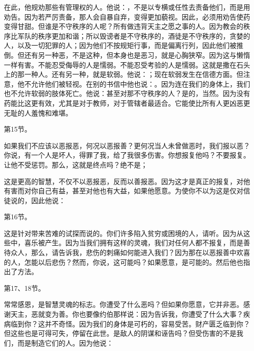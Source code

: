 在此，他规劝那些有管理权的人。他说：，不是以专横或任性去责备他们，而是用劝告。因为若严厉责备，那人会自暴自弃，变得更加藐视。因此，必须用劝告使药变得甘甜。但谁是不守秩序的人呢？所有做违背天主之愿之事的人。因为教会的秩序比军队的秩序更加和谐；所以毁谤者是不守秩序的，酒徒是不守秩序的，贪婪的人，以及一切犯罪的人；因为他们不按规矩行事，而是偏离行列，因此他们被推倒。但还有另一种恶，不是这种，但本身也是恶习，就是心胸狭窄。因为这与懒惰一样有害。不能忍受侮辱的人是懦弱。不能忍受考验的人是懦弱。这就是撒在石头上的那一种人。还有另一种，就是软弱。他说：；现在软弱发生在信德方面。但注意，他不允许他们被轻视。在别的书信中他也说：。因为连在我们的身体上，我们也不允许软弱的肢体死亡。他说：甚至对那不守秩序的人？是的，当然。因为没有药能比这更有效，尤其是对于教师，对于管辖者最适合。它能使比所有人更凶恶更无耻的人羞愧和难堪。\par

第15节。\par

如果我们不应该以恶报恶，何况以恶报善？更何况当人未曾做恶时，我们报以恶？你说，有一个人是坏人，得罪了我，给了我很多伤害。你想报复他吗？不要报复。让他不受惩罚。那么，这就是终点吗？绝不是；\par

\par

这是更高的智慧，不仅不以恶报恶，反而以善报恶。因为这才是真正的报复，对他有害而对你自己有益，甚至对他也有大益，如果他愿意。为使你不以为这是仅对信徒说的，因此他说：\par

第16节。\par

这是针对带来苦难的试探而说的。你们许多陷入贫穷或困境的人，请听。因为从这些中，喜乐被产生。因为当我们拥有这样的灵魂，我们对任何人都不报复，而是善待众人，那么，请告诉我，悲伤的刺痛如何能进入我们？因为那在以恶报善中欢喜的人，怎能以后悲伤？然而，你说，这可能吗？如果愿意，是可能的。然后他也指出了方法。\par

第17、18节。\par

常常感恩，是智慧灵魂的标志。你遭受了什么恶吗？但如果你愿意，它并非恶。感谢天主，恶就变为善。你也要像约伯那样说：因为告诉我，你遭受了什么大事？疾病临到你？这并不奇怪。因为我们的身体是可朽的，容易受苦。财产匮乏临到你？但这些也是可得可失，停留在此世。是敌人的阴谋和诬告吗？但受伤害的不是我们，而是制造它们的人。因为他说：\par

